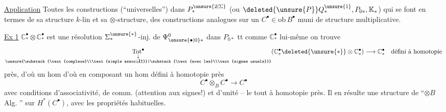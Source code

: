 \uline{Application} Toutes les constructions (``universelles'') dans $P_*^{\unsure{2|\Sigma}}$  (ou $\deleted{\unsure{P}}Q_*^{\unsure{1}},P_{0*},\mathbb{K}_*$) qui se font  en termes de sa structure $k$-lin et sa $\otimes$-structure,   des constructions analogues sur un $C^{\bullet}\in\mathrm{ob}\,B^{\bullet}$ muni de structure multiplicative.

\uline{Ex 1}   $\mathbb{C}^{\bullet}_*\otimes \mathbb{C}^{\bullet}_*$ est une résolution $\Sigma^{\unsure{*}}_*$-inj. de $\Psi^0_{\unsure{\bullet|0}*}$ dans $P_{0*}$ tt comme $\mathbb{C}^{\bullet}_*$ lui-même on trouve
\[
\underset{\substack{\downarrow\\\unsure{\substack{\text{complexe}\\\text{simple associé}}|\substack{\text{avec les}\\\text{signes usuels}}}}}{\operatorname{Tot}^{\bullet}}(\mathbb{C}^{\bullet}_*\deleted{\unsure{\ast}}\otimes \mathbb{C}^{\bullet}_*)\longrightarrow \mathbb{C}^{\bullet}_*\quad\text{défini à homotopie}
\]
près, d'où un hom
d'où en composant un hom défini à homotopie près
\[
C^{\bullet}\otimes_B C^{\bullet}\longrightarrow C^{\bullet}
\]
avec conditions d'associativité, de comm. (attention aux signes!) et d'unité -- le tout à homotopie près. Il en résulte une structure de ``$\otimes B$ Alg. '' sur $H^*(C^{\bullet})$, avec les propriétés habituelles.

